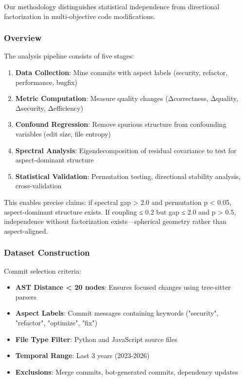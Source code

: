 
Our methodology distinguishes statistical independence from directional factorization in multi-objective code modifications.

\subsubsection{Overview}

The analysis pipeline consists of five stages:

\begin{enumerate}
\item \textbf{Data Collection}: Mine commits with aspect labels (security, refactor, performance, bugfix)
\item \textbf{Metric Computation}: Measure quality changes (Δcorrectness, Δquality, Δsecurity, Δefficiency)
\item \textbf{Confound Regression}: Remove spurious structure from confounding variables (edit size, file entropy)
\item \textbf{Spectral Analysis}: Eigendecomposition of residual covariance to test for aspect-dominant structure
\item \textbf{Statistical Validation}: Permutation testing, directional stability analysis, cross-validation
\end{enumerate}

This enables precise claims: if spectral gap > 2.0 and permutation p < 0.05, aspect-dominant structure exists. If coupling ≤ 0.2 but gap ≤ 2.0 and p > 0.5, independence without factorization exists—spherical geometry rather than aspect-aligned.

\subsubsection{Dataset Construction}

Commit selection criteria:
\begin{itemize}
\item \textbf{AST Distance < 20 nodes}: Ensures focused changes using tree-sitter parsers
\item \textbf{Aspect Labels}: Commit messages containing keywords ("security", "refactor", "optimize", "fix")
\item \textbf{File Type Filter}: Python and JavaScript source files
\item \textbf{Temporal Range}: Last 3 years (2023-2026)
\item \textbf{Exclusions}: Merge commits, bot-generated commits, dependency updates
\end{itemize}

